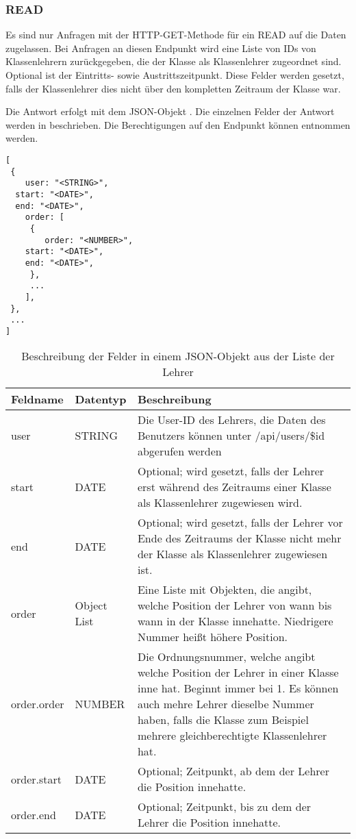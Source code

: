 \subsubsection{READ}
\label{sec:rest:api:classes:id:teachers:read}
Es sind nur Anfragen mit der HTTP-GET-Methode für ein READ auf die Daten zugelassen.
Bei Anfragen an diesen Endpunkt wird eine Liste von IDs von Klassenlehrern zurückgegeben, die der Klasse als Klassenlehrer zugeordnet sind.
Optional ist der Eintritts- sowie Austrittszeitpunkt. Diese Felder werden gesetzt, falls der Klassenlehrer dies nicht über den kompletten Zeitraum der Klasse war.

Die Antwort erfolgt mit dem JSON-Objekt . 
Die einzelnen Felder der Antwort werden in  beschrieben.
Die Berechtigungen auf den Endpunkt können  entnommen werden.

\begin{lstlisting}[caption={JSON-Antwort für einen GET-Aufruf des Pfads /api/classes/\$id/teachers},label={lst:code:rest:api:classes:id:teachers:read:ret},frame=tlrb]
[ 
 { 
	user: "<STRING>",
  start: "<DATE>",
  end: "<DATE>",
	order: [
	 {
		order: "<NUMBER>",
    start: "<DATE>",
    end: "<DATE>",
	 },
	 ...
	],
 },
 ... 
]
\end{lstlisting}

\begin{longtable}{|p{}|p{}|p{}|}
		\caption{Beschreibung der Felder in einem JSON-Objekt aus der Liste der Lehrer}
\endfoot
		\caption{Beschreibung der Felder in einem JSON-Objekt aus der Liste der Lehrer}
		\label{tab:rest:api:classes:id:teachers:read:ret}
\endlastfoot 
\hline
			\textbf{Feldname} & \textbf{Datentyp} & \textbf{Beschreibung} \\ \hline
\endhead
user & STRING & Die User-ID des Lehrers, die Daten des Benutzers können unter /api/users/\$id abgerufen werden  \\ \hline
start & DATE & Optional; wird gesetzt, falls der Lehrer erst während des Zeitraums einer Klasse als Klassenlehrer zugewiesen wird. \\ \hline
end & DATE & Optional; wird gesetzt, falls der Lehrer vor Ende des Zeitraums der Klasse nicht mehr der Klasse als Klassenlehrer zugewiesen ist. \\ \hline
order & Object List & Eine Liste mit Objekten, die angibt, welche Position der Lehrer von wann bis wann in der Klasse innehatte. Niedrigere Nummer heißt höhere Position. \\ \hline
order.order & NUMBER & Die Ordnungsnummer, welche angibt welche Position der Lehrer in einer Klasse inne hat. Beginnt immer bei 1. Es können auch mehre Lehrer dieselbe Nummer haben, falls die Klasse zum Beispiel mehrere gleichberechtigte Klassenlehrer hat. \\ \hline
order.start & DATE & Optional; Zeitpunkt, ab dem der Lehrer die Position innehatte. \\ \hline
order.end & DATE & Optional; Zeitpunkt, bis zu dem der Lehrer die Position innehatte. \\ \hline
\end{longtable}
